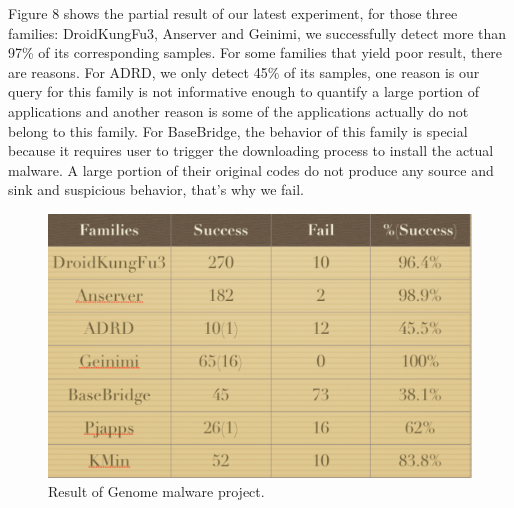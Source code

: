 \documentclass{sig-alternate}
\begin{document}
Figure 8 shows the partial result of our latest experiment, for those three families: DroidKungFu3, Anserver and Geinimi, we successfully detect more than 97\% of its corresponding samples. For some families that yield poor result, there are reasons. For ADRD, we only detect 45\% of its samples, one reason is our query for this family is not informative enough to quantify a large portion of applications and another reason is some of the applications  actually do not belong to this family. For BaseBridge, the behavior of this family is special because it requires user to trigger the downloading process to install the actual malware.  A large portion of their original codes do not produce any source and sink and suspicious behavior, that's why we fail.

\begin{figure}
\begin{center}
  \includegraphics[scale=0.35]{img/genome}
\end{center}
\caption{Result of Genome malware project.}
\label{fig-ffsm}
\end{figure}
\end{document}

